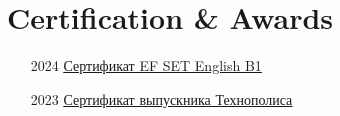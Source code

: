 \documentclass[11pt]{article}
\begin{document}
\section{Certification \& Awards}
\begin{enumerate}[itemsep=0pt]
    \item [2024] \href{https://disk.yandex.ru/i/_CuHJW-1k6qG8A}{\underline{Сертификат EF SET English B1}}
    \item [2023] \href{https://disk.yandex.ru/i/Ftcyy4kuYyXlEQ}{\underline{Сертификат выпускника Технополиса}}
\end{enumerate}
\end{document}
